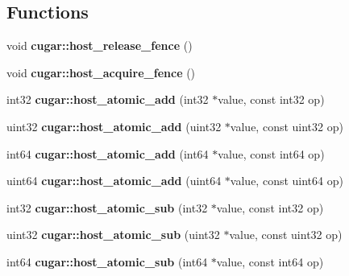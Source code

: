 \subsection*{Functions}
\begin{DoxyCompactItemize}
\item 
\mbox{\label{group___atomics_ga67162ca1a09e35e860fe540bfdf6dbe8}} 
void {\bfseries cugar\+::host\+\_\+release\+\_\+fence} ()
\item 
\mbox{\label{group___atomics_gaefb8e349465d1ec7ac8fbe9ec6300d18}} 
void {\bfseries cugar\+::host\+\_\+acquire\+\_\+fence} ()
\item 
\mbox{\label{group___atomics_gaa5cb62d8e1ff37eb3fd05f4f1987456a}} 
int32 {\bfseries cugar\+::host\+\_\+atomic\+\_\+add} (int32 $\ast$value, const int32 op)
\item 
\mbox{\label{group___atomics_gabc4b79b9f9d824d5e8af14c6bde9c95d}} 
uint32 {\bfseries cugar\+::host\+\_\+atomic\+\_\+add} (uint32 $\ast$value, const uint32 op)
\item 
\mbox{\label{group___atomics_ga0c236c3c2899740c7736d7b88edec307}} 
int64 {\bfseries cugar\+::host\+\_\+atomic\+\_\+add} (int64 $\ast$value, const int64 op)
\item 
\mbox{\label{group___atomics_ga19d506f8dca51f0f3d2db4dba41ecbcf}} 
uint64 {\bfseries cugar\+::host\+\_\+atomic\+\_\+add} (uint64 $\ast$value, const uint64 op)
\item 
\mbox{\label{group___atomics_gaf747361ba69633265de15a83d046bb4c}} 
int32 {\bfseries cugar\+::host\+\_\+atomic\+\_\+sub} (int32 $\ast$value, const int32 op)
\item 
\mbox{\label{group___atomics_ga14ea60eb9ccb660caf8383747a0f93d8}} 
uint32 {\bfseries cugar\+::host\+\_\+atomic\+\_\+sub} (uint32 $\ast$value, const uint32 op)
\item 
\mbox{\label{group___atomics_ga1852c34edff8556f5d09d90fd4c9c0bf}} 
int64 {\bfseries cugar\+::host\+\_\+atomic\+\_\+sub} (int64 $\ast$value, const int64 op)

\end{DoxyCompactItemize}
